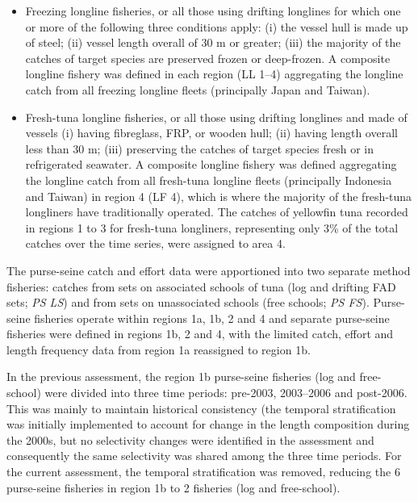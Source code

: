 \documentclass[
]{scrartcl}
\begin{document}
\begin{itemize}
\item
  Freezing longline fisheries, or all those using drifting longlines for
  which one or more of the following three conditions apply: (i) the
  vessel hull is made up of steel; (ii) vessel length overall of 30 m or
  greater; (iii) the majority of the catches of target species are
  preserved frozen or deep-frozen. A composite longline fishery was
  defined in each region (LL 1--4) aggregating the longline catch from
  all freezing longline fleets (principally Japan and Taiwan).
\item
  Fresh-tuna longline fisheries, or all those using drifting longlines
  and made of vessels (i) having fibreglass, FRP, or wooden hull; (ii)
  having length overall less than 30 m; (iii) preserving the catches of
  target species fresh or in refrigerated seawater. A composite longline
  fishery was defined aggregating the longline catch from all fresh-tuna
  longline fleets (principally Indonesia and Taiwan) in region 4 (LF 4),
  which is where the majority of the fresh-tuna longliners have
  traditionally operated. The catches of yellowfin tuna recorded in
  regions 1 to 3 for fresh-tuna longliners, representing only 3\% of the
  total catches over the time series, were assigned to area 4.
\end{itemize}

The purse-seine catch and effort data were apportioned into two separate
method fisheries: catches from sets on associated schools of tuna (log
and drifting FAD sets; \emph{PS LS}) and from sets on unassociated
schools (free schools; \emph{PS FS}). Purse-seine fisheries operate
within regions 1a, 1b, 2 and 4 and separate purse-seine fisheries were
defined in regions 1b, 2 and 4, with the limited catch, effort and
length frequency data from region 1a reassigned to region 1b.

In the previous assessment, the region 1b purse-seine fisheries (log and
free-school) were divided into three time periods: pre-2003, 2003--2006
and post-2006. This was mainly to maintain historical consistency (the
temporal stratification was initially implemented to account for change
in the length composition during the 2000s, but no selectivity changes
were identified in the assessment and consequently the same selectivity
was shared among the three time periods. For the current assessment, the
temporal stratification was removed, reducing the 6 purse-seine
fisheries in region 1b to 2 fisheries (log and free-school).
\end{document}
